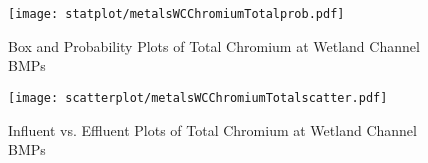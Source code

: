         \begin{figure}[hb]   %
            \centering
            \texttt{[image: statplot/metalsWCChromiumTotalprob.pdf]}
            \caption{Box and Probability Plots of Total Chromium at Wetland Channel BMPs}
        \end{figure}         %
        
        
        \begin{figure}[hb]   %
            \centering
            \texttt{[image: scatterplot/metalsWCChromiumTotalscatter.pdf]}
            \caption{Influent vs. Effluent Plots of Total Chromium at Wetland Channel BMPs}
        \end{figure}         %
        \clearpage
        